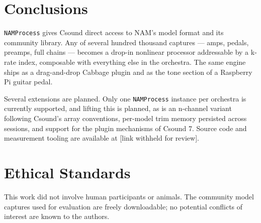 \documentclass[sigconf,anonymous,review]{nimeart}
\begin{document}
\section{Conclusions}
\label{sec:conclusions}

\texttt{NAMProcess} gives Csound direct access to NAM's model format and
its community library. Any of several hundred thousand captures --- amps,
pedals, preamps, full chains --- becomes a drop-in nonlinear processor
addressable by a k-rate index, composable with everything else in the
orchestra. The same engine ships as a drag-and-drop Cabbage plugin and as
the tone section of a Raspberry Pi guitar pedal.

Several extensions are planned. Only one \texttt{NAMProcess} instance per
orchestra is currently supported, and lifting this is planned, as is an
n-channel variant following Csound's array conventions, per-model trim
memory persisted across sessions, and support for the plugin mechanisms of
Csound 7. Source code and measurement tooling are available at [link
withheld for review].

\section{Ethical Standards}

This work did not involve human participants or animals. The community
model captures used for evaluation are freely downloadable; no potential
conflicts of interest are known to the authors.




\end{document}
